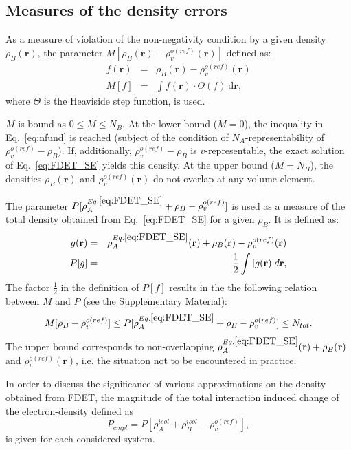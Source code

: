 \documentclass[amsmath,amssymb,preprint,aip,jcp]{revtex4-1}
\begin{document}
\subsection{Measures of the density errors}
As a measure of violation of the non-negativity condition by a given density $\rho_{B}(\mathbf{r})$, the
 parameter $M[\rho_{B}(\mathbf{r})-\rho_v^{o(ref)}(\mathbf{r})]$ defined as:
\begin{eqnarray}\label{eq:M}
f(\mathbf{r})&=&\rho_{B}(\mathbf{r})-\rho_v^{o(ref)}(\mathbf{r}) \nonumber\\
 M[f] & = & \int f(\mathbf{r})\cdot \Theta(f) \ \mathrm{d}\mathbf{r}, \label{eq:def_M}
\end{eqnarray}
where $\Theta$ is the Heaviside step function, is used.

$M$ is bound as $0 \le M\le N_{B}$. At the lower bound ($M=0$), the inequality in Eq.~\ref{eq:nfund} is reached (subject of the condition of $N_A$-representability of $\rho_v^{o(ref)}-\rho_{B}$). If, additionally, $\rho_v^{o(ref)}-\rho_{B}$ is $v$-representable, the exact solution of Eq.~\ref{eq:FDET_SE} yields this density. At the upper bound ($M=N_{B}$), the densities $\rho_{B}(\mathbf{r})$ and $\rho_v^{o(ref)}(\mathbf{r})$ do not overlap at any volume element.

The parameter $P[\rho_A^{Eq.\ref{eq:FDET_SE}}+\rho_B-\rho_{v}^{o(ref)}]$ is used as a measure of the total density obtained from Eq.~\ref{eq:FDET_SE}
for a given $\rho_{B}$. It is defined as: 
\begin{eqnarray}
g(\mathbf{r})&=&\rho^{Eq.\ref{eq:FDET_SE}}_A(\mathbf{r})+ \rho_B(\mathbf{r}) - \rho_{v}^{o(ref)}(\mathbf{r}) \nonumber\\
 P[g] &=& \frac{1}{2} 
 \int \vert g(\mathbf{r}) \vert d\mathbf{r}, \label{eq:def_P}
\end{eqnarray}
The factor $\frac{1}{2}$ in the definition of $P[f]$ results in
the the following relation between $M$ and $P$ (see the Supplementary Material):
\begin{equation} \label{eq:P_bound}
 M[\rho_{B} - \rho^{o(ref)}_{v}] \leq P[\rho^{Eq.\ref{eq:FDET_SE}}_A+\rho_B - \rho_{v}^{o(ref)}] \leq %
 N_{tot}.
\end{equation}
The upper bound  corresponds to non-overlapping  $\rho^{Eq.\ref{eq:FDET_SE}}_A(\mathbf{r})+\rho_B(\mathbf{r})$ and $\rho_{v}^{o(ref)}(\mathbf{r})$, i.e. the situation not to be encountered in practice.

In order to discuss the significance of various approximations on the density obtained from FDET, 
the magnitude of the total
interaction induced change of the electron-density defined as 
\begin{equation}\label{eq:p_cmpl}
 P_{cmpl} = P[\rho_A^{isol}+\rho_B^{isol} - \rho_{v}^{o(ref)}],
\end{equation}
is given for each considered system. 
\end{document}
